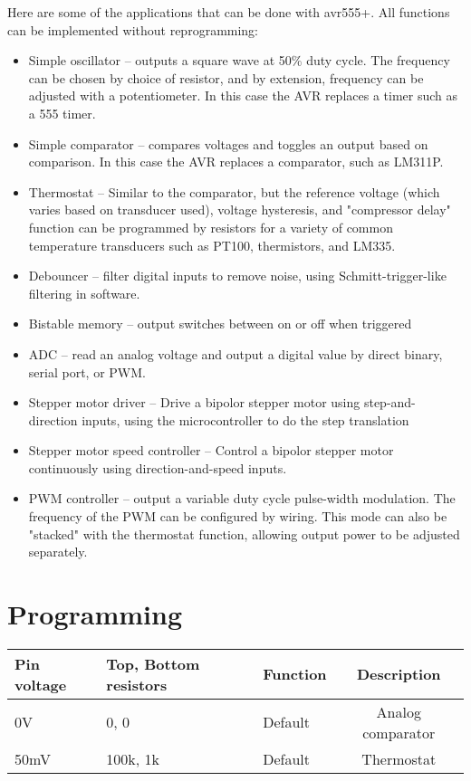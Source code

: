 \documentclass[dvips,12pt]{article}
\begin{document}
Here are some of the applications that can be done with avr555+. All functions can be implemented without reprogramming:
\begin{itemize}
\item Simple oscillator -- outputs a square wave at 50\% duty cycle. The frequency can be chosen by choice of resistor, and by extension, frequency can be adjusted with a potentiometer. In this case the AVR replaces a timer such as a 555 timer.\\
\item Simple comparator -- compares voltages and toggles an output based on comparison. In this case the AVR replaces a comparator, such as LM311P.
\item Thermostat -- Similar to the comparator, but the reference voltage (which varies based on transducer used), voltage hysteresis, and "compressor delay" function can be programmed by resistors for a variety of common temperature transducers such as PT100, thermistors, and LM335.
\item Debouncer -- filter digital inputs to remove noise, using Schmitt-trigger-like filtering in software.
\item Bistable memory -- output switches between on or off when triggered
\item ADC -- read an analog voltage and output a digital value by direct binary, serial port, or PWM.
\item Stepper motor driver -- Drive a bipolor stepper motor using step-and-direction inputs, using the microcontroller to do the step translation
\item Stepper motor speed controller -- Control a bipolor stepper motor continuously using direction-and-speed inputs.
\item PWM controller -- output a variable duty cycle pulse-width modulation. The frequency of the PWM can be configured by wiring. This mode can also be "stacked" with the thermostat function, allowing output power to be adjusted separately.

\end{itemize}

\section{Programming}

\begin{tabular}{|l|l|l|c|}
\hline
Pin voltage & Top, Bottom resistors & Function & Description\\
\hline
0V& 0, 0 &Default  & Analog comparator\\
\hline
50mV& 100k, 1k& Default  & Thermostat \\
\hline
\end {tabular}
\end{document}
